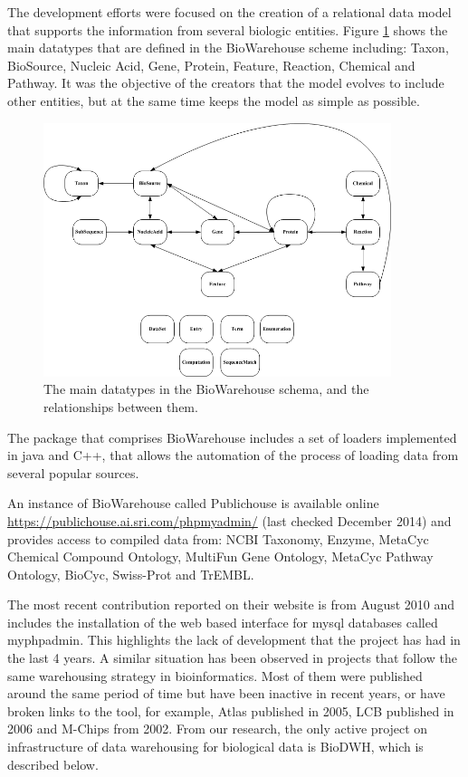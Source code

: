 The development efforts were focused on the creation of a relational data model that supports the information from several biologic entities. Figure \ref{fig:biowarehouse} shows the main datatypes that are defined in the BioWarehouse scheme including: Taxon, BioSource, Nucleic Acid, Gene, Protein, Feature, Reaction, Chemical and Pathway. It was the objective of the creators that the model evolves to include other entities, but at the same time keeps the model as simple as possible.

\begin{figure}  
\centering
\includegraphics[width=4in]{figures/biowarehouse.png}
\caption[Original BioWarehouse schema.]{The main datatypes in the BioWarehouse schema, and the relationships between them.
\label{fig:biowarehouse}}
\end{figure}

The package that comprises BioWarehouse includes a set of loaders implemented in java and C++, that allows the automation of the process of loading data from several popular sources. 

An instance of BioWarehouse called Publichouse is available online \url{https://publichouse.ai.sri.com/phpmyadmin/} (last checked December 2014) and provides access to compiled data from: NCBI Taxonomy, Enzyme, MetaCyc Chemical Compound Ontology, MultiFun Gene Ontology, MetaCyc Pathway Ontology, BioCyc, Swiss-Prot and TrEMBL.

The most recent contribution reported on their website is from August 2010 and includes the installation of the web based interface for mysql databases called myphpadmin. This highlights the lack of development that the project has had in the last 4 years. A similar situation has been observed in projects that follow the same warehousing strategy in bioinformatics. Most of them were published around the same period of time but have been inactive in recent years, or have broken links to the tool, for example, Atlas \cite{SHA2005} published in 2005, LCB\cite{AME2006} published in 2006 and M-Chips \cite{FEL2002} from 2002. From our research, the only active project on infrastructure of data warehousing for biological data is BioDWH, which is described below.

